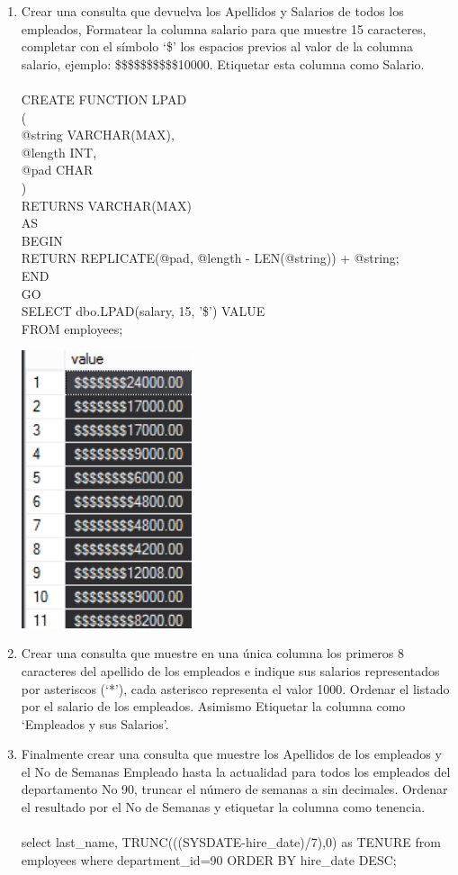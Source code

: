\begin{enumerate}[1.]
	\item Crear una consulta que devuelva los Apellidos y Salarios de todos los empleados, Formatear la columna salario para que muestre 15 caracteres, completar con el símbolo ‘\$’ los espacios previos al valor de la columna salario, ejemplo: \$\$\$\$\$\$\$\$\$\$10000. Etiquetar esta columna como Salario.
	\\
	\\CREATE FUNCTION LPAD
	\\(
	\\ @string VARCHAR(MAX), 
	\\@length INT,          
	\\@pad CHAR             
	\\)
	\\RETURNS VARCHAR(MAX)
	\\AS
	\\BEGIN
	    \\RETURN REPLICATE(@pad, @length - LEN(@string)) + @string;
	\\END
	\\GO
	\\SELECT dbo.LPAD(salary, 15, '\$') VALUE
	\\FROM employees;
	\begin{center}
		\includegraphics[width=5cm]{./Imagenes/457}
	\end{center}

	\item Crear una consulta que muestre en una única columna los primeros 8 caracteres del apellido de los empleados e indique sus salarios representados por asteriscos (‘*’), cada asterisco representa el valor 1000. Ordenar el listado por el salario de los empleados. Asimismo Etiquetar la columna como ‘Empleados y sus Salarios’.
	\item Finalmente crear una consulta que muestre los Apellidos de los empleados y el No de Semanas Empleado hasta la actualidad para todos los empleados del departamento No 90, truncar el número de semanas a sin decimales. Ordenar el resultado por el No de Semanas y etiquetar la columna como tenencia.
	\\
	\\select last\_name, TRUNC(((SYSDATE-hire\_date)/7),0) as TENURE from employees where department\_id=90 ORDER BY hire\_date DESC;
\end{enumerate}

